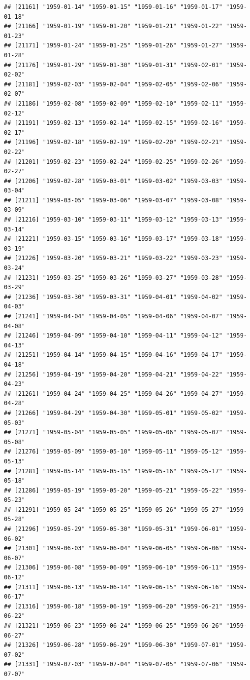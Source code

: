 \documentclass{article}\usepackage[]{graphicx}\usepackage[]{color}
\makeatletter
\newenvironment{kframe}{%
 \def\at@end@of@kframe{}%
 \ifinner\ifhmode%
  \def\at@end@of@kframe{\end{minipage}}%
  \begin{minipage}{\columnwidth}%
 \fi\fi%
 \def\FrameCommand##1{\hskip\@totalleftmargin \hskip-\fboxsep
 \colorbox{shadecolor}{##1}\hskip-\fboxsep
     \hskip-\linewidth \hskip-\@totalleftmargin \hskip\columnwidth}%
 \MakeFramed {\advance\hsize-\width
   \@totalleftmargin\z@ \linewidth\hsize
   \@setminipage}}%
 {\par\unskip\endMakeFramed%
 \at@end@of@kframe}
\newenvironment{knitrout}{}{} %
\makeatother
\begin{document}
\begin{description}
\begin{knitrout}
\begin{kframe}
\begin{verbatim}
## [21161] "1959-01-14" "1959-01-15" "1959-01-16" "1959-01-17" "1959-01-18"
## [21166] "1959-01-19" "1959-01-20" "1959-01-21" "1959-01-22" "1959-01-23"
## [21171] "1959-01-24" "1959-01-25" "1959-01-26" "1959-01-27" "1959-01-28"
## [21176] "1959-01-29" "1959-01-30" "1959-01-31" "1959-02-01" "1959-02-02"
## [21181] "1959-02-03" "1959-02-04" "1959-02-05" "1959-02-06" "1959-02-07"
## [21186] "1959-02-08" "1959-02-09" "1959-02-10" "1959-02-11" "1959-02-12"
## [21191] "1959-02-13" "1959-02-14" "1959-02-15" "1959-02-16" "1959-02-17"
## [21196] "1959-02-18" "1959-02-19" "1959-02-20" "1959-02-21" "1959-02-22"
## [21201] "1959-02-23" "1959-02-24" "1959-02-25" "1959-02-26" "1959-02-27"
## [21206] "1959-02-28" "1959-03-01" "1959-03-02" "1959-03-03" "1959-03-04"
## [21211] "1959-03-05" "1959-03-06" "1959-03-07" "1959-03-08" "1959-03-09"
## [21216] "1959-03-10" "1959-03-11" "1959-03-12" "1959-03-13" "1959-03-14"
## [21221] "1959-03-15" "1959-03-16" "1959-03-17" "1959-03-18" "1959-03-19"
## [21226] "1959-03-20" "1959-03-21" "1959-03-22" "1959-03-23" "1959-03-24"
## [21231] "1959-03-25" "1959-03-26" "1959-03-27" "1959-03-28" "1959-03-29"
## [21236] "1959-03-30" "1959-03-31" "1959-04-01" "1959-04-02" "1959-04-03"
## [21241] "1959-04-04" "1959-04-05" "1959-04-06" "1959-04-07" "1959-04-08"
## [21246] "1959-04-09" "1959-04-10" "1959-04-11" "1959-04-12" "1959-04-13"
## [21251] "1959-04-14" "1959-04-15" "1959-04-16" "1959-04-17" "1959-04-18"
## [21256] "1959-04-19" "1959-04-20" "1959-04-21" "1959-04-22" "1959-04-23"
## [21261] "1959-04-24" "1959-04-25" "1959-04-26" "1959-04-27" "1959-04-28"
## [21266] "1959-04-29" "1959-04-30" "1959-05-01" "1959-05-02" "1959-05-03"
## [21271] "1959-05-04" "1959-05-05" "1959-05-06" "1959-05-07" "1959-05-08"
## [21276] "1959-05-09" "1959-05-10" "1959-05-11" "1959-05-12" "1959-05-13"
## [21281] "1959-05-14" "1959-05-15" "1959-05-16" "1959-05-17" "1959-05-18"
## [21286] "1959-05-19" "1959-05-20" "1959-05-21" "1959-05-22" "1959-05-23"
## [21291] "1959-05-24" "1959-05-25" "1959-05-26" "1959-05-27" "1959-05-28"
## [21296] "1959-05-29" "1959-05-30" "1959-05-31" "1959-06-01" "1959-06-02"
## [21301] "1959-06-03" "1959-06-04" "1959-06-05" "1959-06-06" "1959-06-07"
## [21306] "1959-06-08" "1959-06-09" "1959-06-10" "1959-06-11" "1959-06-12"
## [21311] "1959-06-13" "1959-06-14" "1959-06-15" "1959-06-16" "1959-06-17"
## [21316] "1959-06-18" "1959-06-19" "1959-06-20" "1959-06-21" "1959-06-22"
## [21321] "1959-06-23" "1959-06-24" "1959-06-25" "1959-06-26" "1959-06-27"
## [21326] "1959-06-28" "1959-06-29" "1959-06-30" "1959-07-01" "1959-07-02"
## [21331] "1959-07-03" "1959-07-04" "1959-07-05" "1959-07-06" "1959-07-07"

\end{verbatim}
\end{kframe}
\end{knitrout}
\end{description}
\end{document}
